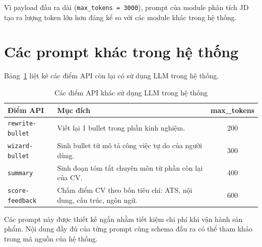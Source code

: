 \documentclass[../DoAn.tex]{subfiles}
\begin{document}
Vì payload đầu ra dài (\texttt{max\_tokens = 3000}), prompt của module phân tích JD tạo ra lượng token lớn hơn đáng kể so với các module khác trong hệ thống.

\section{Các prompt khác trong hệ thống}

Bảng~\ref{tab:other-llm} liệt kê các điểm API còn lại có sử dụng LLM trong hệ thống.

\begin{table}[H]
\centering
\caption{Các điểm API khác sử dụng LLM trong hệ thống}
\label{tab:other-llm}
\begin{tabular}{|l|p{7cm}|c|}
\hline
\textbf{Điểm API} & \textbf{Mục đích} & \textbf{max\_tokens} \\
\hline
\texttt{rewrite-bullet} & Viết lại 1 bullet trong phần kinh nghiệm. & 200 \\
\hline
\texttt{wizard-bullet} & Sinh bullet từ mô tả công việc tự do của người dùng. & 300 \\
\hline
\texttt{summary} & Sinh đoạn tóm tắt chuyên môn từ phần còn lại của CV. & 400 \\
\hline
\texttt{score-feedback} & Chấm điểm CV theo bốn tiêu chí: ATS, nội dung, cấu trúc, ngôn ngữ. & 600 \\
\hline
\end{tabular}
\end{table}

Các prompt này được thiết kế ngắn nhằm tiết kiệm chi phí khi vận hành sản phẩm. Nội dung đầy đủ của từng prompt cùng schema đầu ra có thể tham khảo trong mã nguồn của hệ thống.
\end{document}
